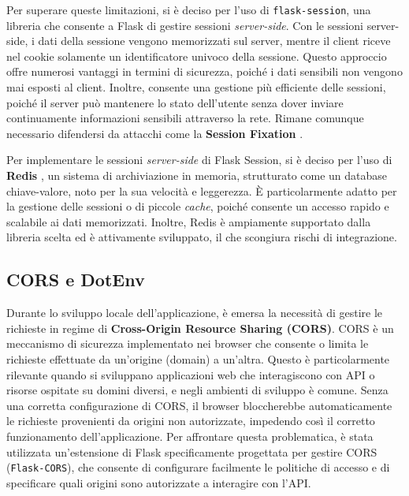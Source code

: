 Per superare queste limitazioni, si è deciso per l'uso di \texttt{flask-session}, una libreria che consente a Flask di gestire sessioni \emph{server-side}. Con le sessioni server-side, i dati della sessione vengono memorizzati sul server, mentre il client riceve nel cookie solamente un identificatore univoco della sessione. Questo approccio offre numerosi vantaggi in termini di sicurezza, poiché i dati sensibili non vengono mai esposti al client. Inoltre, consente una gestione più efficiente delle sessioni, poiché il server può mantenere lo stato dell'utente senza dover inviare continuamente informazioni sensibili attraverso la rete.
Rimane comunque necessario difendersi da attacchi come la \textbf{Session Fixation} \cite{flask-session}.

Per implementare le sessioni \emph{server-side} di Flask Session, si è deciso per l'uso di \textbf{Redis} \cite{redis}, un sistema di archiviazione in memoria, strutturato come un database chiave-valore, noto per la sua velocità e leggerezza. È particolarmente adatto per la gestione delle sessioni o di piccole \emph{cache}, poiché consente un accesso rapido e scalabile ai dati memorizzati. Inoltre, Redis è ampiamente supportato dalla libreria scelta ed è attivamente sviluppato, il che scongiura rischi di integrazione.

\subsection{CORS e DotEnv}
Durante lo sviluppo locale dell'applicazione, è emersa la necessità di gestire le richieste in regime di \textbf{Cross-Origin Resource Sharing (CORS)}. CORS è un meccanismo di sicurezza implementato nei browser che consente o limita le richieste effettuate da un'origine (domain) a un'altra. Questo è particolarmente rilevante quando si sviluppano applicazioni web che interagiscono con API o risorse ospitate su domini diversi, e negli ambienti di sviluppo è comune. Senza una corretta configurazione di CORS, il browser bloccherebbe automaticamente le richieste provenienti da origini non autorizzate, impedendo così il corretto funzionamento dell'applicazione. Per affrontare questa problematica, è stata utilizzata un'estensione di Flask specificamente progettata per gestire CORS (\texttt{Flask-CORS}), che consente di configurare facilmente le politiche di accesso e di specificare quali origini sono autorizzate a interagire con l'API.

